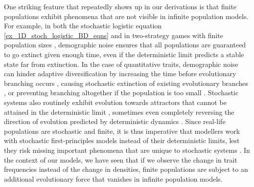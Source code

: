 One striking feature that repeatedly shows up in our derivations is that finite populations exhibit phenomena that are not visible in infinite population models. For example, in both the stochastic logistic equation \ref{ex_1D_stoch_logistic_BD_eqns} and in two-strategy games with finite population sizes \citep{tao_stochastic_2007}, demographic noise ensures that all populations are guaranteed to go extinct given enough time, even if the deterministic limit predicts a stable state far from extinction. In the case of quantitative traits, demographic noise can hinder adaptive diversification by increasing the time before evolutionary branching occurs \citep{claessen_delayed_2007, wakano_evolutionary_2013, debarre_evolutionary_2016}, causing stochastic extinction of existing evolutionary branches \citep{rogers_demographic_2012, johansson_will_2006}, or preventing branching altogether if the population is too small \citep{rogers_modes_2015, johnson_two-dimensional_2021}. Stochastic systems also routinely exhibit evolution towards attractors that cannot be attained in the deterministic limit \citep{delong_stochasticity_2023}, sometimes even completely reversing the direction of evolution predicted by deterministic dynamics \citep{constable_demographic_2016,mcleod_social_2019}. Since real-life populations are stochastic and finite, it is thus imperative that modellers work with stochastic first-principles models instead of their deterministic limits, lest they risk missing important phenomena that are unique to stochastic systems \citep{black_stochastic_2012,schreiber_does_2022,hastings_transients_2004,shoemaker_integrating_2020}. In the context of our models, we have seen that if we observe the change in trait frequencies instead of the change in densities, finite populations are subject to an additional evolutionary force that vanishes in infinite population models.

